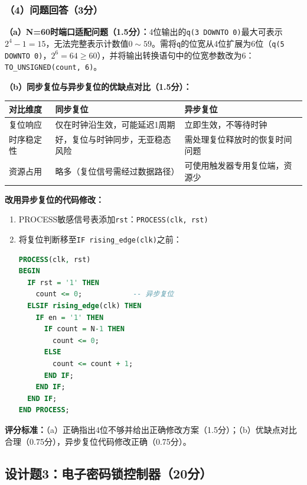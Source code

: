 \subsubsection*{（4）问题回答（3分）}

\textbf{（a）N=60时端口适配问题（1.5分）：}4位输出的\texttt{q(3 DOWNTO 0)}最大可表示$2^4-1=15$，无法完整表示计数值$0\sim59$。需将\texttt{q}的位宽从4位扩展为6位（\texttt{q(5 DOWNTO 0)}，$2^6=64\ge60$），并将输出转换语句中的位宽参数改为6：\texttt{TO\_UNSIGNED(count, 6)}。

\textbf{（b）同步复位与异步复位的优缺点对比（1.5分）：}

\begin{table}[h]
\centering
\begin{tabular}{|p{}|p{}|p{}|}
\hline
\textbf{对比维度} & \textbf{同步复位} & \textbf{异步复位} \\
\hline
复位响应 & 仅在时钟沿生效，可能延迟1周期 & 立即生效，不等待时钟 \\
\hline
时序稳定性 & 好，复位与时钟同步，无亚稳态风险 & 需处理复位释放时的恢复时间问题 \\
\hline
资源占用 & 略多（复位信号需经过数据路径） & 可使用触发器专用复位端，资源少 \\
\hline
\end{tabular}
\end{table}

\textbf{改用异步复位的代码修改：}
\begin{enumerate}
  \item PROCESS敏感信号表添加\texttt{rst}：\texttt{PROCESS(clk, rst)}
  \item 将复位判断移至\texttt{IF rising\_edge(clk)}之前：

\begin{lstlisting}[language=VHDL]
PROCESS(clk, rst)
BEGIN
  IF rst = '1' THEN
    count <= 0;            -- 异步复位
  ELSIF rising_edge(clk) THEN
    IF en = '1' THEN
      IF count = N-1 THEN
        count <= 0;
      ELSE
        count <= count + 1;
      END IF;
    END IF;
  END IF;
END PROCESS;
\end{lstlisting}
\end{enumerate}

\textbf{评分标准：}（a）正确指出4位不够并给出正确修改方案（1.5分）；（b）优缺点对比合理（0.75分），异步复位代码修改正确（0.75分）。

\newpage

\subsection*{设计题3：电子密码锁控制器（20分）}

